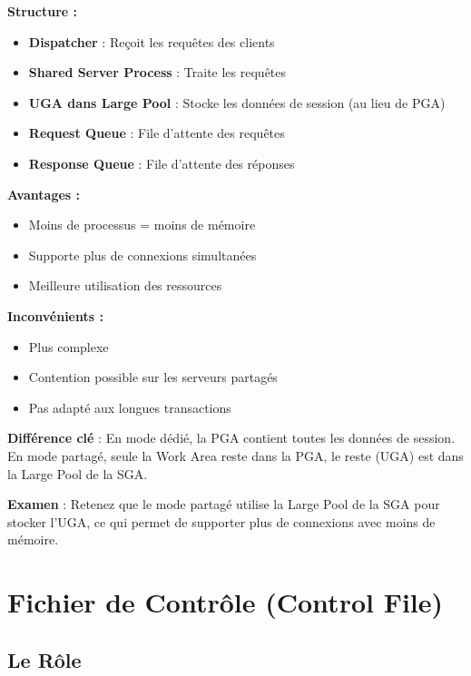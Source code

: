 \documentclass[11pt,a4paper]{article}
\begin{document}
\textbf{Structure :}
\begin{itemize}
    \item \textbf{Dispatcher} : Reçoit les requêtes des clients
    \item \textbf{Shared Server Process} : Traite les requêtes
    \item \textbf{UGA dans Large Pool} : Stocke les données de session (au lieu de PGA)
    \item \textbf{Request Queue} : File d'attente des requêtes
    \item \textbf{Response Queue} : File d'attente des réponses
\end{itemize}

\textbf{Avantages :}
\begin{itemize}
    \item Moins de processus = moins de mémoire
    \item Supporte plus de connexions simultanées
    \item Meilleure utilisation des ressources
\end{itemize}

\textbf{Inconvénients :}
\begin{itemize}
    \item Plus complexe
    \item Contention possible sur les serveurs partagés
    \item Pas adapté aux longues transactions
\end{itemize}

\begin{importantbox}
\textbf{Différence clé} : En mode dédié, la PGA contient toutes les données de session. En mode partagé, seule la Work Area reste dans la PGA, le reste (UGA) est dans la Large Pool de la SGA.
\end{importantbox}

\begin{tipbox}
\textbf{Examen} : Retenez que le mode partagé utilise la Large Pool de la SGA pour stocker l'UGA, ce qui permet de supporter plus de connexions avec moins de mémoire.
\end{tipbox}

\section{Fichier de Contrôle (Control File)}

\subsection{Le Rôle}
\end{document}
